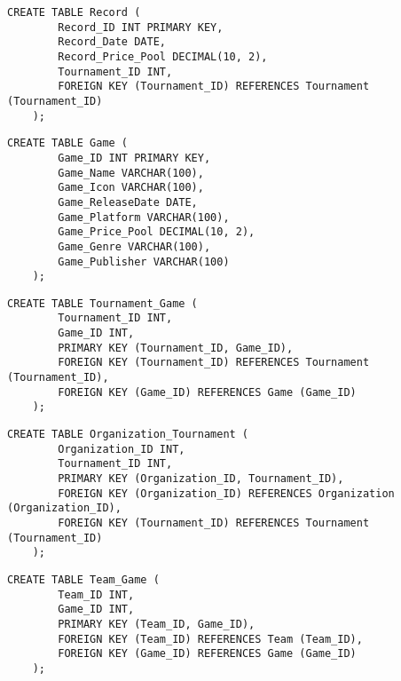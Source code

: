     \begin{lstlisting}[caption={Create Record table}, label={lst:create_record}]
    CREATE TABLE Record (
        Record_ID INT PRIMARY KEY,
        Record_Date DATE,
        Record_Price_Pool DECIMAL(10, 2),
        Tournament_ID INT,
        FOREIGN KEY (Tournament_ID) REFERENCES Tournament (Tournament_ID)
    );
    \end{lstlisting}
    
    \begin{lstlisting}[caption={Create Game table}, label={lst:create_game}]
    CREATE TABLE Game (
        Game_ID INT PRIMARY KEY,
        Game_Name VARCHAR(100),
        Game_Icon VARCHAR(100),
        Game_ReleaseDate DATE,
        Game_Platform VARCHAR(100),
        Game_Price_Pool DECIMAL(10, 2),
        Game_Genre VARCHAR(100),
        Game_Publisher VARCHAR(100)
    );
    \end{lstlisting}
    
    \begin{lstlisting}[caption={Create Tournament Game table}, label={lst:create_tournament_game}]
    CREATE TABLE Tournament_Game (
        Tournament_ID INT,
        Game_ID INT,
        PRIMARY KEY (Tournament_ID, Game_ID),
        FOREIGN KEY (Tournament_ID) REFERENCES Tournament (Tournament_ID),
        FOREIGN KEY (Game_ID) REFERENCES Game (Game_ID)
    );
    \end{lstlisting}
    
    \begin{lstlisting}[caption={Create Organization Tournament table}, label={lst:create_organization_tournament}]
    CREATE TABLE Organization_Tournament (
        Organization_ID INT,
        Tournament_ID INT,
        PRIMARY KEY (Organization_ID, Tournament_ID),
        FOREIGN KEY (Organization_ID) REFERENCES Organization (Organization_ID),
        FOREIGN KEY (Tournament_ID) REFERENCES Tournament (Tournament_ID)
    );
    \end{lstlisting}
    
    \begin{lstlisting}[caption={Create Team Game table}, label={lst:create_team_game}]
    CREATE TABLE Team_Game (
        Team_ID INT,
        Game_ID INT,
        PRIMARY KEY (Team_ID, Game_ID),
        FOREIGN KEY (Team_ID) REFERENCES Team (Team_ID),
        FOREIGN KEY (Game_ID) REFERENCES Game (Game_ID)
    );
    \end{lstlisting}
    
